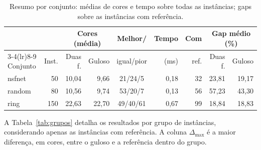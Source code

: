 \documentclass[12pt]{article}
\begin{document}
\begin{table}[ht]
  \centering
  \caption{Resumo por conjunto: médias de cores e tempo sobre todas as
    instâncias; gaps sobre as instâncias com referência.}
  \label{tab:resumo}
  \footnotesize\setlength{\tabcolsep}{4pt}
  \begin{tabular}{lrrrcrrrr}
    \toprule
    & & \multicolumn{2}{c}{Cores (média)} & Melhor/ & Tempo & Com & \multicolumn{2}{c}{Gap médio (\%)} \\
    \cmidrule(lr){3-4}\cmidrule(lr){8-9}
    Conjunto & Inst. & Duas f. & Guloso & igual/pior & (ms) & ref. & Duas f. & Guloso \\
    \midrule
    nsfnet & 50  & 10,04 & 9,66  & 21/24/5  & 0,18 & 32 & 23,81 & 19,17 \\
    random & 80  & 10,56 & 9,74  & 53/20/7  & 0,13 & 56 & 57,23 & 43,30 \\
    ring   & 150 & 22,63 & 22,70 & 49/40/61 & 0,67 & 99 & 18,84 & 18,83 \\
    \bottomrule
  \end{tabular}
\end{table}

A Tabela~\ref{tab:grupos} detalha os resultados por grupo de instâncias,
considerando apenas as instâncias com referência. A coluna $\Delta_{\max}$ é a
maior diferença, em cores, entre o guloso e a referência dentro do grupo.
\end{document}
